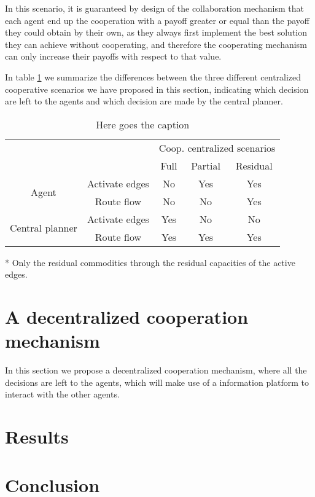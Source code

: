 \documentclass[review]{elsarticle}
\begin{document}
In this scenario, it is guaranteed by design of the collaboration
mechanism that each agent end up the cooperation with a payoff greater or equal than the payoff they could obtain by their own, as they always first implement the best solution they can achieve without cooperating, and therefore the cooperating mechanism can only increase their payoffs with respect to that value.

In table \ref{tb:summarycentralizedmodels} we summarize the differences between the three different centralized cooperative scenarios we have proposed in this section, indicating which decision are left to the agents and which decision are made by the central planner.

\begin{table}[ht!]
	\centering
	\caption{Here goes the caption \label{tb:summarycentralizedmodels}}
    \begin{threeparttable}
        \begin{tabular}{ccccc}
            & &      \multicolumn{3}{c}{Coop. centralized scenarios} \\\cline{3-5}
            & & Full & Partial & Residual \\ \hline
            \multirow{2}{*}{Agent} & Activate edges & No & Yes & Yes \\
            & Route flow     & No & No & Yes \\\hline
            \multirow{2}{*}{Central planner} & Activate edges & Yes & No & No \\
            & Route flow & Yes & Yes & Yes\tnote{*} \\\hline\hline
        \end{tabular}
    \begin{tablenotes}\footnotesize
        \item[*] Only the residual commodities through the residual capacities
        of the active edges.
        \end{tablenotes}
    \end{threeparttable}
    \end {table}

\section{A decentralized cooperation mechanism}

In this section we propose a decentralized cooperation mechanism, where all the decisions are left to the agents, which will make use of a information platform to interact with the other agents.

\section{Results}

\section{Conclusion}



\end{document}

